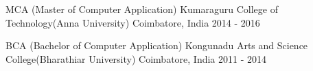 

\begin{cventries}

  \cventry
    {MCA (Master of Computer Application)} %
    {Kumaraguru College of Technology(Anna University)} %
    {Coimbatore, India} %
    {2014 - 2016} %
    {
    }

\cventry
    {BCA (Bachelor of Computer Application)} %
    {Kongunadu Arts and Science College(Bharathiar University)} %
    {Coimbatore, India} %
    {2011 - 2014} %
    {
    }

\end{cventries}
